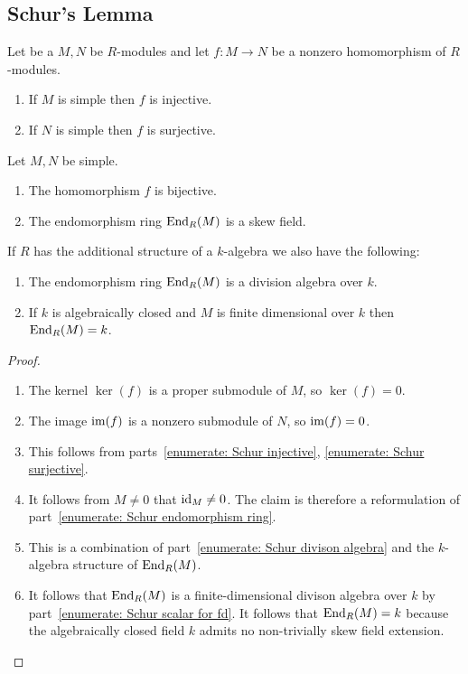 \subsection{Schur’s Lemma}


\begin{proposition}
  \label{proposition: Schurs lemma for modules}
  Let be a $M, N$ be $R$-modules and let $f \colon M \to N$ be a nonzero homomorphism of $R$-modules.
  \begin{enumerate}
    \item
      \label{enumerate: Schur injective}
      If $M$ is simple then $f$ is injective.
    \item
      \label{enumerate: Schur surjective}
      If $N$ is simple then $f$ is surjective.
  \end{enumerate}
  Let $M, N$ be simple.
  \begin{enumerate}[resume]
    \item
      \label{enumerate: Schur bijective}
      The homomorphism $f$ is bijective.
    \item
      \label{enumerate: Schur endomorphism ring}
      The endomorphism ring $\operatorname{End}_R(M)$ is a skew field.
  \end{enumerate}
  If $R$ has the additional structure of a $k$-algebra we also have the following:
  \begin{enumerate}[resume]
    \item
      \label{enumerate: Schur divison algebra}
      The endomorphism ring $\operatorname{End}_R(M)$ is a division algebra over $k$.
    \item
      \label{enumerate: Schur scalar for fd}
      If $k$ is algebraically closed and $M$ is finite dimensional over $k$ then $\operatorname{End}_R(M) = k$.
  \end{enumerate}
\end{proposition}


\begin{proof}
  \leavevmode
  \begin{enumerate}
    \item
      The kernel $\ker(f)$ is a proper submodule of $M$, so $\ker(f) = 0$.
    \item
      The image $\operatorname{im}(f)$ is a nonzero submodule of $N$, so $\operatorname{im}(f) = 0$.
    \item
      This follows from parts~\ref*{enumerate: Schur injective}, \ref*{enumerate: Schur surjective}.
    \item
      It follows from $M \neq 0$ that $\operatorname{id}_M \neq 0$.
      The claim is therefore a reformulation of part~\ref*{enumerate: Schur endomorphism ring}.
    \item
      This is a combination of part~\ref*{enumerate: Schur divison algebra} and the $k$-algebra structure of $\operatorname{End}_R(M)$.
    \item
      It follows that $\operatorname{End}_R(M)$ is a finite-dimensional divison algebra over $k$ by part~\ref*{enumerate: Schur scalar for fd}.
      It follows that $\operatorname{End}_R(M) = k$ because the algebraically closed field $k$ admits no non-trivially skew field extension.
    \qedhere
  \end{enumerate}
\end{proof}


